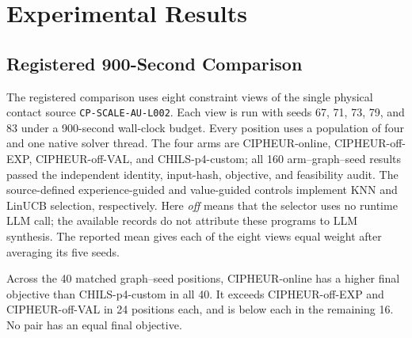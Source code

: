 \documentclass[sigconf,anonymous]{aamas}
\begin{document}
\section{Experimental Results}

\subsection{Registered 900-Second Comparison}


The registered comparison uses eight constraint views of the single physical contact source \texttt{CP-SCALE-AU-L002}. Each view is run with seeds 67, 71, 73, 79, and 83 under a 900-second wall-clock budget. Every position uses a population of four and one native solver thread. The four arms are CIPHEUR-online, CIPHEUR-off-EXP, CIPHEUR-off-VAL, and CHILS-p4-custom; all 160 arm--graph--seed results passed the independent identity, input-hash, objective, and feasibility audit. The source-defined experience-guided and value-guided controls implement KNN and LinUCB selection, respectively. Here \textit{off} means that the selector uses no runtime LLM call; the available records do not attribute these programs to LLM synthesis. The reported mean gives each of the eight views equal weight after averaging its five seeds.

Across the 40 matched graph--seed positions, CIPHEUR-online has a higher
final objective than CHILS-p4-custom in all 40. It exceeds CIPHEUR-off-EXP
and CIPHEUR-off-VAL in 24 positions each, and is below each in the
remaining 16. No pair has an equal final objective.










\FloatBarrier


\end{document}
